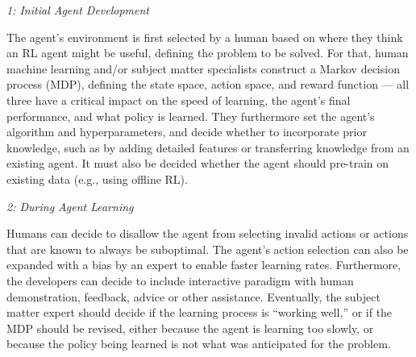 \documentclass[twoside,11pt]{article}
\begin{document}

\vspace{2mm}
\emph{1: Initial Agent Development}

The agent's environment is first selected by a human based on where they think an RL agent might be useful, defining the problem to be solved. For that, human machine learning and/or subject matter specialists construct a Markov decision process (MDP), defining the state space, action space, and reward function --- all three have a critical impact on the speed of learning, the agent's final performance, and what policy is learned. They furthermore set the agent's algorithm and hyperparameters, and decide whether to incorporate prior knowledge, such as by adding detailed features or transferring knowledge from an existing agent. It must also be decided whether the agent should pre-train on existing data (e.g., using offline RL).
\vspace{2mm}

\emph{2: During Agent Learning}

Humans can decide to disallow the agent from selecting invalid actions or actions that are known to always be suboptimal. The agent's action selection can also be expanded with a bias by an expert to  enable faster learning rates. Furthermore, the developers can decide to include interactive paradigm with human demonstration, feedback, advice or other assistance.
Eventually, the subject matter expert should decide if the learning process is ``working well,'' or if the MDP should be revised, either because the agent is learning too slowly, or because the policy being learned is not what was anticipated for the problem.
\vspace{2mm}
\end{document}
